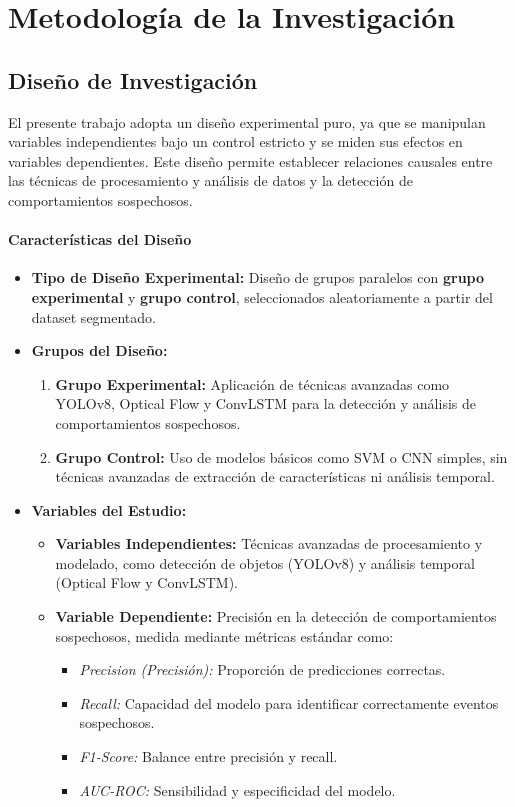 \chapter{Metodología de la Investigación}
\section{Diseño de Investigación}
El presente trabajo adopta un diseño experimental puro, ya que se manipulan variables independientes bajo un control estricto y se miden sus efectos en variables dependientes. Este diseño permite establecer relaciones causales entre las técnicas de procesamiento y análisis de datos y la detección de comportamientos sospechosos.

\subsubsection{Características del Diseño}
\begin{itemize}
    \item \textbf{Tipo de Diseño Experimental:} Diseño de grupos paralelos con \textbf{grupo experimental} y \textbf{grupo control}, seleccionados aleatoriamente a partir del dataset segmentado.
    \item \textbf{Grupos del Diseño:}
    \begin{enumerate}
        \item \textbf{Grupo Experimental:} 
        Aplicación de técnicas avanzadas como YOLOv8, Optical Flow y ConvLSTM para la detección y análisis de comportamientos sospechosos.
        \item \textbf{Grupo Control:} 
        Uso de modelos básicos como SVM o CNN simples, sin técnicas avanzadas de extracción de características ni análisis temporal.
    \end{enumerate}
    \item \textbf{Variables del Estudio:}
    \begin{itemize}
        \item \textbf{Variables Independientes:} Técnicas avanzadas de procesamiento y modelado, como detección de objetos (YOLOv8) y análisis temporal (Optical Flow y ConvLSTM).
        \item \textbf{Variable Dependiente:} Precisión en la detección de comportamientos sospechosos, medida mediante métricas estándar como:
        \begin{itemize}
            \item \textit{Precision (Precisión):} Proporción de predicciones correctas.
            \item \textit{Recall:} Capacidad del modelo para identificar correctamente eventos sospechosos.
            \item \textit{F1-Score:} Balance entre precisión y recall.
            \item \textit{AUC-ROC:} Sensibilidad y especificidad del modelo.
        \end{itemize}
    \end{itemize}
\end{itemize}

